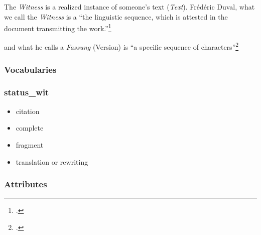 The \textit{Witness} is a realized instance of someone's text (\textit{Text}). Frédéric Duval, what we call the \textit{Witness} is a ``the linguistic sequence, which is attested in the document transmitting the work.''\footcite[``la séquence linguistique attestée dans un document transmettant l'oeuvre.''][16]{Duval2017} 


and what he calls a \textit{Fassung} (Version) is ``a specific sequence of characters''\footcite[``einen Bestand an Schriftzeichen.''][47]{Sahle2013} 

\subsubsection{Vocabularies}



\subsubsection{status\_wit}
\begin{itemize}
    \item citation
    \item complete
    \item fragment
    \item translation or rewriting
\end{itemize}

\subsubsection{Attributes}

